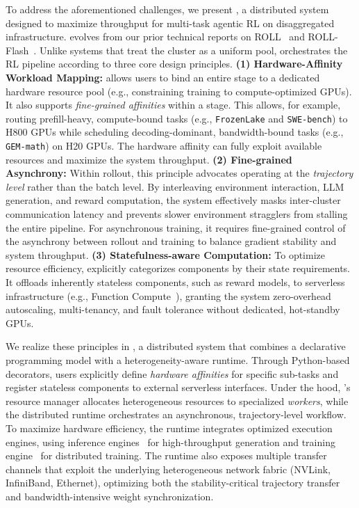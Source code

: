 To address the aforementioned challenges, we present \SystemName{}, a distributed system
designed to maximize throughput for multi-task agentic RL on disaggregated
infrastructure. \SystemName{} evolves from our prior technical reports on ROLL~\cite{roll} and ROLL-Flash~\cite{rollflash}. Unlike systems that treat the cluster as a uniform
pool, \SystemName{} orchestrates the RL pipeline according to three
core design principles. \textbf{(1) Hardware-Affinity Workload
Mapping:} \SystemName{} allows users to bind an entire stage to a dedicated
hardware resource pool (e.g., constraining training to compute-optimized
GPUs). It also supports \emph{fine-grained affinities} within a stage. This
allows, for example, routing prefill-heavy, compute-bound tasks (e.g., \texttt
{FrozenLake} and \texttt{SWE-bench}) to H800 GPUs while scheduling
decoding-dominant, bandwidth-bound tasks (e.g., \texttt{GEM-math}) on H20
GPUs. The hardware affinity can fully exploit available resources and
maximize the system throughput. \textbf{(2) Fine-grained Asynchrony:} Within rollout, this principle advocates operating
at the \emph{trajectory level} rather than the batch level. By interleaving
environment interaction, LLM generation, and reward computation, the system
effectively masks inter-cluster communication latency and prevents slower
environment stragglers from stalling the entire pipeline. For asynchronous
training, it requires fine-grained control of the asynchrony between rollout
and training to balance gradient stability and system throughput. \textbf{
(3) Statefulness-aware Computation:} To optimize resource
efficiency, \SystemName{} explicitly categorizes components by their state
requirements. It offloads inherently stateless components, such as reward
models, to serverless infrastructure (e.g., Function Compute~\cite
{alibaba_function_compute}), granting the system zero-overhead autoscaling,
multi-tenancy, and fault tolerance without dedicated, hot-standby GPUs.

We realize these principles in \SystemName{}, a distributed system that
combines a declarative programming model with a heterogeneity-aware runtime.
Through Python-based decorators, users explicitly define \emph
{hardware affinities} for specific sub-tasks and register stateless
components to external serverless interfaces. Under the hood, \SystemName
{}'s resource manager allocates heterogeneous resources to specialized \emph
{workers}, while the distributed runtime orchestrates an asynchronous,
trajectory-level workflow. To maximize hardware efficiency, the runtime
integrates optimized execution engines, using inference engines~\cite{vllm, sglang,rtp-llm} for
high-throughput generation and training engine~\cite{shoeybi2019megatron} for
distributed training. The runtime also exposes multiple transfer channels that exploit the underlying heterogeneous network fabric (NVLink, InfiniBand, Ethernet), optimizing both
the stability-critical trajectory transfer and bandwidth-intensive weight synchronization. %

